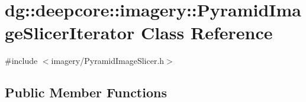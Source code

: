 \hypertarget{classdg_1_1deepcore_1_1imagery_1_1_pyramid_image_slicer_iterator}{}\section{dg\+:\+:deepcore\+:\+:imagery\+:\+:Pyramid\+Image\+Slicer\+Iterator Class Reference}
\label{classdg_1_1deepcore_1_1imagery_1_1_pyramid_image_slicer_iterator}


{\ttfamily \#include $<$imagery/\+Pyramid\+Image\+Slicer.\+h$>$}

\subsection*{Public Member Functions}
